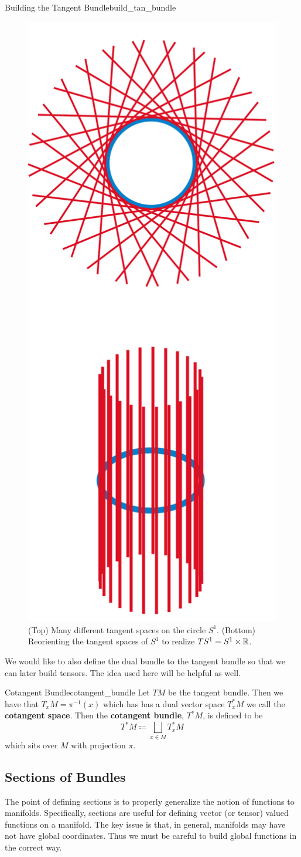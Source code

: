 \begin{fig}{Building the Tangent Bundle}{build_tan_bundle}
\begin{figure}[H]
    \centering
    \includegraphics[width=.3\textwidth]{TACA_2019/s^1_tangent_bundle.png}
    \caption{(Top) Many different tangent spaces on the circle $S^1$. (Bottom) Reorienting the tangent spaces of $S^1$ to realize $TS^1=S^1\times \mathbb{R}$.}
    \label{fig:tangent_bundle}
\end{figure}
\end{fig}

We would like to also define the dual bundle to the tangent bundle so that we can later build tensors.  The idea used here will be helpful as well.

\begin{df}{Cotangent Bundle}{cotangent_bundle}
Let $TM$ be the tangent bundle.  Then we have that $T_xM=\pi^{-1}(x)$ which has has a dual vector space $T_x^*M$ we call the \textbf{cotangent space}.  Then the \textbf{cotangent bundle}, $T^*M$, is defined to be
\[
T^*M \coloneqq \bigsqcup_{x\in M} T_x^*M
\]
which sits over $M$ with projection $\pi$. 
\end{df}

\subsection{Sections of Bundles}
The point of defining sections is to properly generalize the notion of functions to manifolds. Specifically, sections are useful for defining vector (or tensor) valued functions on a manifold. The key issue is that, in general, manifolds may have not have global coordinates.  Thus we must be careful to build global functions in the correct way.


